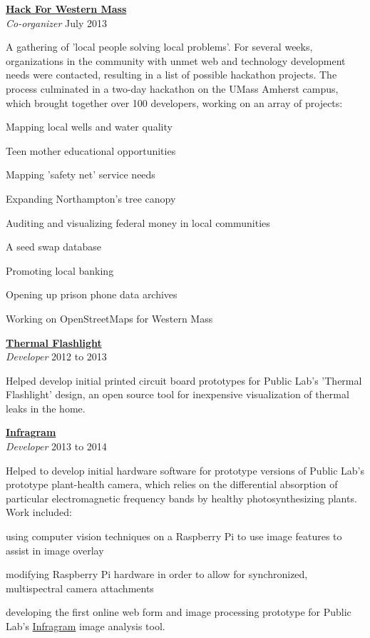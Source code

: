 \documentclass[10pt]{article}
\newcommand{\blankline}{\quad\pagebreak[3]}
\newcommand{\halfblankline}{\quad\vspace{-0.5\baselineskip}\pagebreak[3]}
\begin{document}
\blankline


\href{http://hackforwesternmass.org/}{\textbf{Hack For Western Mass}} \\
\emph{Co-organizer} \hfill {July 2013} 

\halfblankline

A gathering of 'local people solving local problems'. For several weeks, organizations in the community with unmet web and technology development needs were contacted, resulting in a list of possible hackathon projects.  The process culminated in a two-day hackathon on the UMass Amherst campus, which brought together over 100 developers, working on an array of projects:
    \begin{innerlist}
        \item Mapping local wells and water quality
\item Teen mother educational opportunities
\item Mapping 'safety net' service needs
\item Expanding Northampton's tree canopy
\item Auditing and visualizing federal money in local communities
\item A seed swap database
\item Promoting local banking
\item Opening up prison phone data archives
\item Working on OpenStreetMaps for Western Mass
\end{innerlist}

\blankline

\href{http://publiclab.org/wiki/thermal-flashlight}{\textbf{Thermal Flashlight}}\\
\emph{Developer} \hfill {2012 to 2013}

\halfblankline

Helped develop initial printed circuit board prototypes for Public Lab's 'Thermal Flashlight' design, an open source tool for inexpensive visualization of thermal leaks in the home. 

\blankline



\href{http://infragram.org}{\textbf{Infragram}}\\
\emph{Developer} \hfill {2013 to 2014}

\halfblankline

Helped to develop initial hardware software for prototype versions of  Public Lab's prototype plant-health camera, which relies on the differential absorption of particular electromagnetic frequency bands by healthy photosynthesizing plants.  Work included:
 \begin{innerlist}
\item using computer vision techniques on a Raspberry Pi to use image features to assist in image overlay
\item modifying Raspberry Pi hardware in order to allow for synchronized, multispectral camera attachments 
\item developing the first online web form and image processing prototype for Public Lab's \href{http://infragram.org}{Infragram} image analysis tool.
\end{innerlist}
\end{document}
